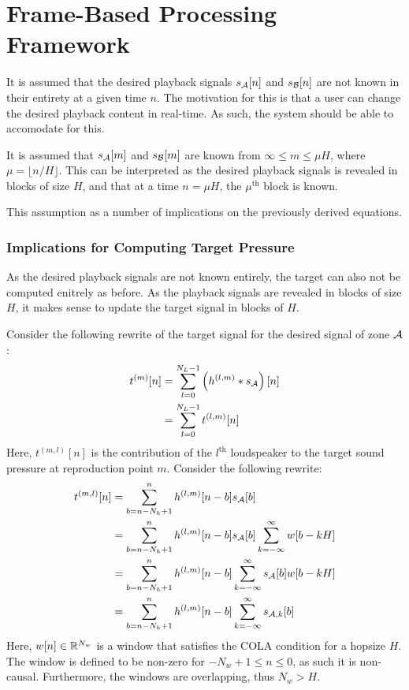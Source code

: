 \section{Frame-Based Processing Framework}
It is assumed that the desired playback signals $s_{\mathcal{A}}[n]$ and $s_{\mathcal{B}}[n]$ are not known in their entirety
at a given time $n$.
The motivation for this is that a user can change the desired playback content in real-time.
As such, the system should be able to accomodate for this.

It is assumed that $s_{\mathcal{A}}[m]$ and $s_{\mathcal{B}}[m]$ are known from $\infty \leq m \leq \mu H$, 
where $\mu = \lfloor n / H \rfloor$.
This can be interpreted as the desired playback signals is revealed in blocks of size $H$, 
and that at a time $n = \mu H$, the $\mu^\text{th}$ block is known.  

This assumption as a number of implications on the previously derived equations.

\subsubsection{Implications for Computing Target Pressure}
As the desired playback signals are not known entirely, the target can also not be computed enitrely as before.
As the playback signals are revealed in blocks of size $H$, it makes sense to update the target signal in blocks of $H$.  

Consider the following rewrite of the target signal for the desired signal of zone $\mathcal{A}$:
\begin{align}
    t^{(m)}[n] &= \sum_{l=0}^{N_L - 1} \left(h^{(l,m)} \ast s_{\mathcal{A}}\right)[n] \\
               &= \sum_{l=0}^{N_L - 1} t^{(l,m)}[n]
\end{align}
Here, $t^{(m,l)}[n]$ is the contribution of the $l^\text{th}$ loudspeaker to the target sound pressure at reproduction point $m$.
Consider the following rewrite:
\begin{align}
     t^{(m,l)}[n]   &= \sum_{b = n - N_h + 1}^{n} h^{(l,m)}[n - b] s_{\mathcal{A}}[b] \\
                    &= \sum_{b = n - N_h + 1}^{n} h^{(l,m)}[n - b] s_{\mathcal{A}}[b] 
                        \sum_{k=-\infty}^{\infty} w[b - kH] \\
                    &= \sum_{b = n - N_h + 1}^{n} h^{(l,m)}[n - b]  
                        \sum_{k=-\infty}^{\infty} s_{\mathcal{A}}[b] w[b - kH] \\
                    &= \sum_{b = n - N_h + 1}^{n} h^{(l,m)}[n - b]  
                        \sum_{k=-\infty}^{\infty} s_{\mathcal{A},k}[b]  
\end{align}
Here, $w[n]\in\mathbb{R}^{N_w}$ is a window that satisfies the COLA condition for a hopsize $H$.
The window is defined to be non-zero for $-N_w + 1 \leq n \leq 0$, as such it is non-causal.
Furthermore, the windows are overlapping, thus $N_w > H$. 

